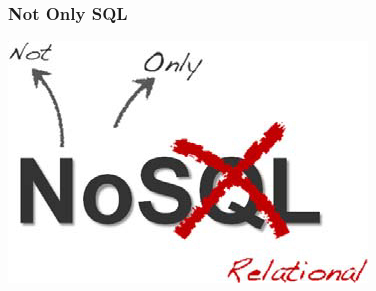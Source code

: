 \documentclass[xcolor=dvipsnames]{beamer}
\begin{document}
\begin{frame}[fragile]
  \frametitle{Not Only SQL}

  \begin{center}
    \includegraphics{nosql-1.jpg}
  \end{center}
\end{frame}
\end{document}
